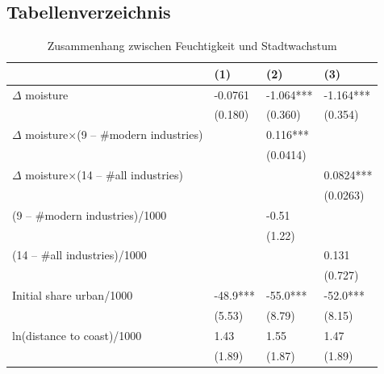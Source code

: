 
\renewcommand*\figurename{Abbildung}
\renewcommand*\tablename{Tabelle}

\newpage

\renewcommand*\contentsname{Inhaltsverzeichnis}
{
\hypersetup{linkcolor=}
\setcounter{tocdepth}{3}
\tableofcontents
}

\newpage

\hypertarget{lot}{%
\subsection{Tabellenverzeichnis}\label{lot}}

\begin{table}[!hbt]
\caption{Zusammenhang zwischen Feuchtigkeit und Stadtwachstum}
\label{tbl1}
\centering
\begin{threeparttable}
  \begin{tabular}{llll} 

    \toprule
                                                & (1)      & (2)       & (3)        \\ 
    \midrule
    $\Delta$ moisture                           & -0.0761  & -1.064*** & -1.164***  \\
                                                & (0.180)  & (0.360)   & (0.354)    \\
    $\Delta$ moisture×(9 – \#modern industries) & ~        & 0.116***  & ~          \\
                                                & ~        & (0.0414)  & ~          \\
    $\Delta$ moisture×(14 – \#all industries)   & ~        & ~         & 0.0824***  \\
                                                & ~        & ~         & (0.0263)   \\
    (9 – \#modern industries)/1000              & ~        & -0.51     & ~          \\
                                                & ~        & (1.22)    & ~          \\
    (14 – \#all industries)/1000                & ~        & ~         & 0.131      \\
                                                & ~        & ~         & (0.727)    \\
    Initial share urban/1000                    & -48.9*** & -55.0***  & -52.0***   \\
                                                & (5.53)   & (8.79)    & (8.15)     \\
    ln(distance to coast)/1000                  & 1.43     & 1.55      & 1.47       \\
                                                & (1.89)   & (1.87)    & (1.89)     \\
    \bottomrule
    \end{tabular}
    

\end{threeparttable}
\end{table}
